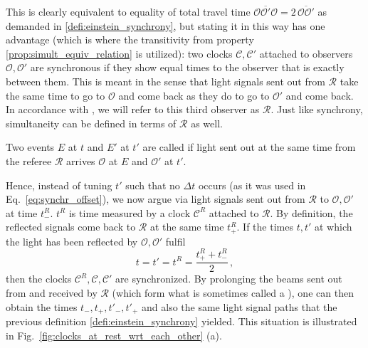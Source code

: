 \documentclass[../relativity_main.tex]{subfiles}
\begin{document}
This is clearly equivalent to equality of total travel time $\overline{\mathcal{O} \mathcal{O}' \mathcal{O}} = 2 \, \overline{\mathcal{O} \mathcal{O}'}$ as demanded in \ref{defi:einstein_synchrony}, but stating it in this way has one advantage (which is where the transitivity from property \ref{prop:simult_equiv_relation} is utilized): two clocks $\mathcal{C}, \mathcal{C}'$ attached to observers $\mathcal{O}, \mathcal{O}'$ are synchronous if they show equal times to the observer that is exactly between them. This is meant in the sense that light signals sent out from $\mathcal{R}$ take the same time to go to $\mathcal{O}$ and come back as they do to go to $\mathcal{O}'$ and come back. In accordance with \cite{dragon_geometry_srt}, we will refer to this third observer as  $\mathcal{R}$. Just like synchrony, simultaneity can be defined in terms of $\mathcal{R}$ as well.
\begin{defi}[Simultaneity 2]
	Two events $E$ at $t$ and $E'$ at $t'$ are called  if light sent out at the same time from the referee $\mathcal{R}$ arrives $\mathcal{O}$ at $E$ and $\mathcal{O}'$ at $t'$.
\end{defi}
Hence, instead of tuning $t'$ such that no $\Delta t$ occurs (as it was used in Eq.~\eqref{eq:synchr_offset}), we now argue via light signals sent out from $\mathcal{R}$ to $\mathcal{O}, \mathcal{O}'$ at time $t^R_-$. $t^R$ is time measured by a clock $\mathcal{C}^R$ attached to $\mathcal{R}$. By definition, the reflected signals come back to $\mathcal{R}$ at the same time $t^R_+$. If the times $t, t'$ at which the light has been reflected by $\mathcal{O}, \mathcal{O}'$ fulfil
\begin{equation}\label{eq:synchr_referee}
	t = t' = t^R = \frac{t^R_+ + t^R_-}{2} \, ,
\end{equation}
then the clocks $\mathcal{C}^R, \mathcal{C}, \mathcal{C}'$ are synchronized. By prolonging the beams sent out from and received by $\mathcal{R}$ (which form what is sometimes called a ), one can then obtain the times $t_-, t_+, t'_-, t'_+$ and also the same light signal paths that the previous definition \ref{defi:einstein_synchrony} yielded. This situation is illustrated in Fig.~\ref{fig:clocks_at_rest_wrt_each_other} (a).
\end{document}

